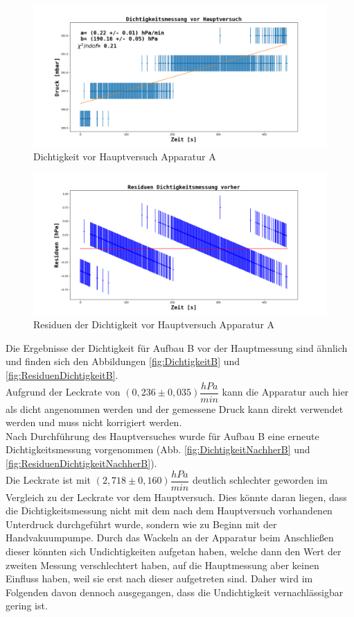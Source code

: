 \documentclass[12pt,a4paper]{article}
\begin{document}
\begin{figure}
\includegraphics[width=\linewidth]{Bilder/Dichtigkeit_vorher_A.png}
\caption[Dichtigkeit vor Hauptversuch Apparatur A]{Dichtigkeit vor Hauptversuch Apparatur A}
\label{fig:DichtigkeitA}
\end{figure}

\begin{figure}
\includegraphics[width=\linewidth]{Bilder/Residuen_Dichtigkeit_vorher_A.png}
\caption[Dichtigkeit vor Hauptversuch Apparatur A]{Residuen der Dichtigkeit vor Hauptversuch Apparatur A}
\label{fig:ResiduenDichtigkeitA}
\end{figure}

Die Ergebnisse der Dichtigkeit für Aufbau B vor der Hauptmessung sind ähnlich und finden sich den Abbildungen \ref{fig:DichtigkeitB} und \ref{fig:ResiduenDichtigkeitB}.\\
Aufgrund der Leckrate von $(0,236 \pm 0,035) \dfrac{hPa}{min}$ kann die Apparatur auch hier als dicht angenommen werden und der gemessene Druck kann direkt verwendet werden und muss nicht korrigiert werden.\\
Nach Durchführung des Hauptversuches wurde für Aufbau B eine erneute Dichtigkeitsmessung vorgenommen (Abb. \ref{fig:DichtigkeitNachherB} und \ref{fig:ResiduenDichtigkeitNachherB}).\\
Die Leckrate ist mit $(2,718 \pm 0,160) \dfrac{hPa}{min}$ deutlich schlechter geworden im Vergleich zu der Leckrate vor dem Hauptversuch. Dies könnte daran liegen, dass die Dichtigkeitsmessung nicht mit dem nach dem Hauptversuch vorhandenen Unterdruck durchgeführt wurde, sondern wie zu Beginn mit der Handvakuumpumpe. Durch das Wackeln an der Apparatur beim Anschließen dieser könnten sich Undichtigkeiten aufgetan haben, welche dann den Wert der zweiten Messung verschlechtert haben, auf die Hauptmessung aber keinen Einfluss haben, weil sie erst nach dieser aufgetreten sind. Daher wird im Folgenden davon dennoch ausgegangen, dass die Undichtigkeit vernachlässigbar gering ist.
\end{document}
